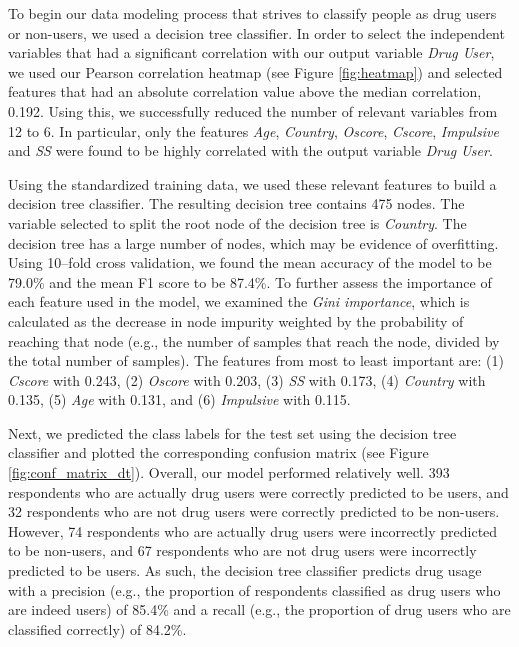 \documentclass[10pt]{article}
\begin{document}
To begin our data modeling process that strives to classify people as drug users or non-users, we used a decision tree classifier. In order to select the independent variables that had a significant correlation with our output variable \textit{Drug User}, we used our Pearson correlation heatmap (see Figure \ref{fig:heatmap}) and selected features that had an absolute correlation value above the median correlation, 0.192. Using this, we successfully reduced the number of relevant variables from 12 to 6. In particular, only the features \textit{Age}, \textit{Country}, \textit{Oscore}, \textit{Cscore}, \textit{Impulsive} and \textit{SS} were found to be highly correlated with the output variable \textit{Drug User}.

Using the standardized training data, we used these relevant features to build a decision tree classifier. The resulting decision tree contains 475 nodes. The variable selected to split the root node of the decision tree is \textit{Country}. The decision tree has a large number of nodes, which may be evidence of overfitting. Using 10–fold cross validation, we found the mean accuracy of the model to be 79.0\% and the mean F1 score to be 87.4\%. To further assess the importance of each feature used in the model, we examined the \textit{Gini importance}, which is calculated as the decrease in node impurity weighted by the probability of reaching that node (e.g., the number of samples that reach the node, divided by the total number of samples). The features from most to least important are: (1) \textit{Cscore} with 0.243, (2) \textit{Oscore} with 0.203, (3) \textit{SS} with 0.173, (4) \textit{Country} with 0.135, (5) \textit{Age} with 0.131, and (6) \textit{Impulsive} with 0.115.

Next, we predicted the class labels for the test set using the decision tree classifier and plotted the corresponding confusion matrix (see Figure \ref{fig:conf_matrix_dt}). Overall, our model performed relatively well. 393 respondents who are actually drug users were correctly predicted to be users, and 32 respondents who are not drug users were correctly predicted to be non-users. However, 74 respondents who are actually drug users were incorrectly predicted to be non-users, and 67 respondents who are not drug users were incorrectly predicted to be users. As such, the decision tree classifier predicts drug usage with a precision (e.g., the proportion of respondents classified as drug users who are indeed users) of 85.4\% and a recall (e.g., the proportion of drug users who are classified correctly) of 84.2\%.
\end{document}
